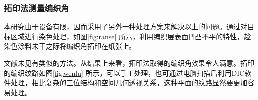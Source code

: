 \subsubsection{拓印法测量编织角}
本研究由于设备有限，因而采用了另外一种处理方案来解决以上的问题。通过对目标区域进行染色处理，如图\ref{fig:ranse} 所示，利用编织层表面凹凸不平的特性，趁染色涂料未干之际将编织角拓印在纸张上。

文献未见有类似的方法。从结果上来看，拓印法取得的编织角效果令人满意。拓印的编织纹路如图\ref{fig:wenlu} 所示，可以手工处理，也可通过电脑扫描后利用DIC软件处理，相比复杂的三位结构和空间几何透视关系，这种平面的纹路显然要更加容易处理。













